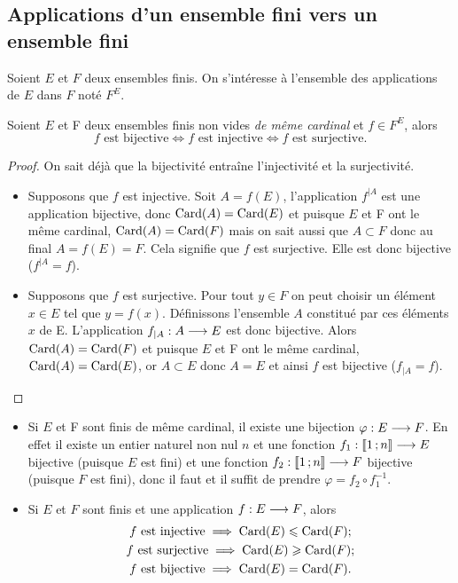\subsection{Applications d'un ensemble fini vers un ensemble fini}

Soient \(E\) et \(F\) deux ensembles finis. On s'intéresse à l'ensemble des
applications de \(E\) dans \(F\) noté \(F^E\).

\begin{theo}
  \label{theo:bijinjsurj}
  Soient \(E\) et F deux ensembles finis non vides \emph{de même cardinal} et
  \(f\in F^E\), alors
  \begin{equation}
    f \text{~est bijective}\iff f \text{~est injective}\iff f \text{~est
    surjective}.
  \end{equation}
\end{theo}

\begin{proof}
  On sait déjà que la bijectivité entraîne l'injectivité et la surjectivité.
  \begin{itemize}
    \item Supposons que \(f\) est injective. Soit \(A = f(E)\), l'application
      \(f^{|A}\) est une application bijective, donc \(\operatorname{Card}(A) = \operatorname{Card}(E)\) et
      puisque \(E\) et F ont le même cardinal, \(\operatorname{Card}(A) = \operatorname{Card}(F)\) mais on
      sait aussi que \(A\subset F\) donc au final \(A = f(E) = F\). Cela
      signifie que \(f\) est surjective. Elle est donc bijective (\(f^{|A} =
      f\)).
    \item Supposons que \(f\) est surjective. Pour tout \(y\in F\) on peut
      choisir un élément \(x\in E\) tel que \(y = f(x)\). Définissons l'ensemble
      \(A\) constitué par ces éléments \(x\) de E. L'application
      \(f_{|A}:A \longrightarrow{} E\) est donc bijective. Alors \(\operatorname{Card}(A) =
      \operatorname{Card}(F)\) et puisque \(E\) et F ont le même cardinal, \(\operatorname{Card}(A) =
      \operatorname{Card}(E)\), or \(A\subset E\) donc \(A = E\) et ainsi \(f\) est bijective
      (\(f_{|A} = f\)).
  \end{itemize}
\end{proof}

\begin{itemize}
  \item Si \(E\) et F sont finis de même cardinal, il existe une bijection
    \(\varphi:E \longrightarrow{} F\). En effet il existe un entier naturel non nul
    \(n\) et une fonction \(f_1:\mathopen{\llbracket}1\mathclose{}\mathpunct{};n\mathclose{\rrbracket} \longrightarrow{} E\)
    bijective (puisque \(E\) est fini) et une fonction
    \(f_2:\mathopen{\llbracket}1\mathclose{}\mathpunct{};n\mathclose{\rrbracket} \longrightarrow{} F\) bijective (puisque \(F\) est
    fini), donc il faut et il suffit de prendre \(\varphi = f_2\circ f_1^{-1}\).
  \item Si \(E\) et \(F\) sont finis et une application \(f:E \longrightarrow{} F\),
    alors
    \begin{gather}
      f \text{~est injective} \implies \operatorname{Card}(E)\leqslant\operatorname{Card}(F); \\
      f \text{~est surjective}\implies \operatorname{Card}(E)\geqslant\operatorname{Card}(F);\\
      f \text{~est bijective} \implies \operatorname{Card}(E) = \operatorname{Card}(F).
    \end{gather}
\end{itemize}

